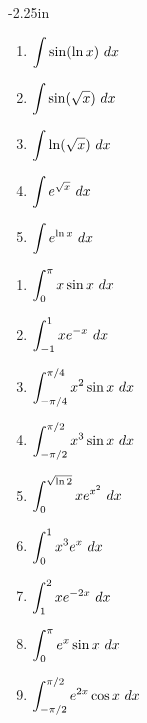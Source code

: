 \begin{adjustwidth*}{}{-2.25in}
\begin{multicols*}{2}

\begin{enumerate}[1),resume]
\item $\ds \int \sin(\ln x)\ dx$
\item $\ds \int \sin(\sqrt{x})\ dx$
\item $\ds \int \ln(\sqrt{x})\ dx$
\item $\ds \int e^{\sqrt{x}}\ dx$
\item $\ds \int e^{\ln x}\ dx$
\end{enumerate}


\begin{enumerate}[1),resume]
\item $\ds \int_0^{\pi} x\sin x\ dx$
\item $\ds \int_{-1}^1 xe^{-x}\ dx$
\item $\ds \int_{-\pi/4}^{\pi/4} x^2\sin x\ dx$
\item $\ds \int_{-\pi/2}^{\pi/2} x^3\sin x\ dx$
\item $\ds \int_0^{\sqrt{\ln{2}}} xe^{x^2}\ dx$
\item $\ds \int_0^1 x^3e^{x}\ dx$
\item $\ds \int_1^2 xe^{-2x}\ dx$
\item $\ds \int_0^{\pi} e^x\sin x\ dx$
\item $\displaystyle \int_{-\pi/2}^{\pi/2} e^{2x}\cos x\ dx$
\end{enumerate}

\end{multicols*}
\end{adjustwidth*}

%
%
%

\afterexercises